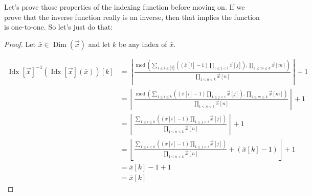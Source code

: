 \documentclass[12pt]{book}
\theoremstyle{plain}
\theoremstyle{definition}
\theoremstyle{ppart}
\theoremstyle{case}
\theoremstyle{solution}
\DeclareMathOperator{\Dim}{Dim}
\DeclareMathOperator{\remainder}{mod}
\DeclareMathOperator{\Idx}{Idx}
\begin{document}
\begin{landscape}
Let's prove those properties of the indexing function before moving on. If we prove that the inverse function
really is an inverse, then that implies the function is one-to-one. So let's just do that:

\begin{proof}
Let $\bar{x} \in \Dim(\vec{x})$ and let $k$ be any index of $\bar{x}$.

\begin{align*}
  \Idx[\vec{x}]^{-1}(\Idx[\vec{x}](\bar{x}))[k] &= 
  \left\lfloor
    \frac{\remainder\left(
      \sum_{1 \le i \le |\vec{x}|} \left( (\bar{x}[i]-1) \prod_{1 \le j < i} \vec{x}[j] \right) 
      , \prod_{1 \le m \le k} \vec{x}[m]\right)}
    {\prod_{1 \le n < k} \vec{x}[n]}
  \right\rfloor + 1 \\
  &=
  \left\lfloor
    \frac{\remainder\left(
      \sum_{1 \le i \le k} \left( (\bar{x}[i]-1) \prod_{1 \le j < i} \vec{x}[j] \right) 
      , \prod_{1 \le m \le k} \vec{x}[m]\right)}
    {\prod_{1 \le n < k} \vec{x}[n]}
  \right\rfloor + 1 \\
  &=
  \left\lfloor
    \frac{
      \sum_{1 \le i \le k} \left( (\bar{x}[i]-1) \prod_{1 \le j < i} \vec{x}[j] \right) 
    }
    {\prod_{1 \le n < k} \vec{x}[n]}
  \right\rfloor + 1 \\
  &=
  \left\lfloor
    \frac{
      \sum_{1 \le i < k} \left( (\bar{x}[i]-1) \prod_{1 \le j < i} \vec{x}[j] \right) 
    }
    {\prod_{1 \le n < k} \vec{x}[n]}
    +
    (\bar{x}[k]-1)
  \right\rfloor + 1 \\
  &= \bar{x}[k]-1+1 \\
  &= \bar{x}[k]
\end{align*}


\end{proof}
\end{landscape}
\end{document}
